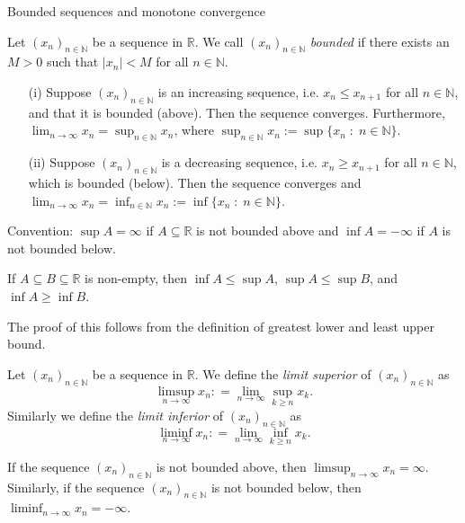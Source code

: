 \documentclass [aspectratio=169]{beamer}
\newcommand{\R}{{\mathbb{R}}}
\newcommand{\N}{{\mathbb{N}}}
\begin{document}
\begin{frame}{Bounded sequences and monotone convergence}
\begin{definition}
Let $(x_n)_{n\in \N}$ be a sequence in $\R$. We call $(x_n)_{n\in \N}$ \emph{bounded} if there exists an $M > 0$ such that $\vert x_n\vert<M$ for all $n\in \N$.
\end{definition}

\vspace{0.5em}

\begin{theorem}
\begin{itemize}
\item[(i)] Suppose $(x_n)_{n\in \N}$ is an increasing sequence, i.e. $x_n\leq x_{n+1}$ for all $n\in \N$, and that it is bounded (above). Then the sequence converges. Furthermore, $\lim_{n\to \infty} x_n = \sup_{n\in \N} x_n$, where $\sup_{n\in \N} x_n := \sup\{x_n \; \colon \; n\in \N\}$.
\item[(ii)] Suppose $(x_n)_{n\in \N}$ is a decreasing sequence, i.e. $x_n\geq x_{n+1}$ for all $n\in \N$, which is bounded (below). Then the sequence converges and $\lim_{n\to \infty} x_n = \inf_{n\in \N} x_n := \inf\{x_n \; \colon \; n\in \N\}$. 
\end{itemize}
\end{theorem}

\end{frame}


\begin{frame}
Convention: $\sup A = \infty$ if $A\subseteq \R$ is not bounded above and $\inf A= -\infty$ if $A$ is not bounded below.

\vspace{0.5em}

\begin{lemma}
If $A \subseteq B \subseteq \R$ is non-empty, then $\inf A \leq \sup A$, $\sup A \leq \sup B$, and $\inf A \geq \inf B$.
\end{lemma}

\vspace{0.5em}
The proof of this follows from the definition of greatest lower and least upper bound. 

\end{frame}

\begin{frame}
\begin{definition}
Let $(x_n)_{n\in \N}$ be a sequence in $\R$. We define the \emph{limit superior} of $(x_n)_{n\in \N}$ as 
$$\limsup_{n\to \infty} x_n: = \lim_{n\to \infty} \sup_{k\geq n} x_k.$$ 
Similarly we define  the \emph{limit inferior} of $(x_n)_{n\in \N}$ as 
$$\liminf_{n\to \infty} x_n: = \lim_{n\to \infty} \inf_{k\geq n} x_k.$$
\end{definition}
\vspace{1em}
If the sequence $(x_n)_{n\in \N}$ is not bounded above, then $\limsup_{n\to \infty} x_n = \infty$. Similarly, if the sequence $(x_n)_{n\in \N}$ is not bounded below, then $\liminf_{n\to \infty} x_n = -\infty$. 
\end{frame}
\end{document}
